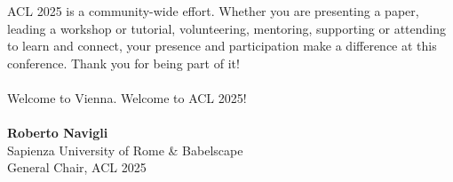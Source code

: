 ACL 2025 is a community-wide effort. Whether you are presenting a paper, leading a workshop or tutorial, volunteering, mentoring, supporting or attending to learn and connect, your presence and participation make a difference at this conference. Thank you for being part of it!\\
\\

Welcome to Vienna. Welcome to ACL 2025!\\
\\
\textbf{Roberto Navigli}\\
Sapienza University of Rome \& Babelscape\\
General Chair, ACL 2025\\
